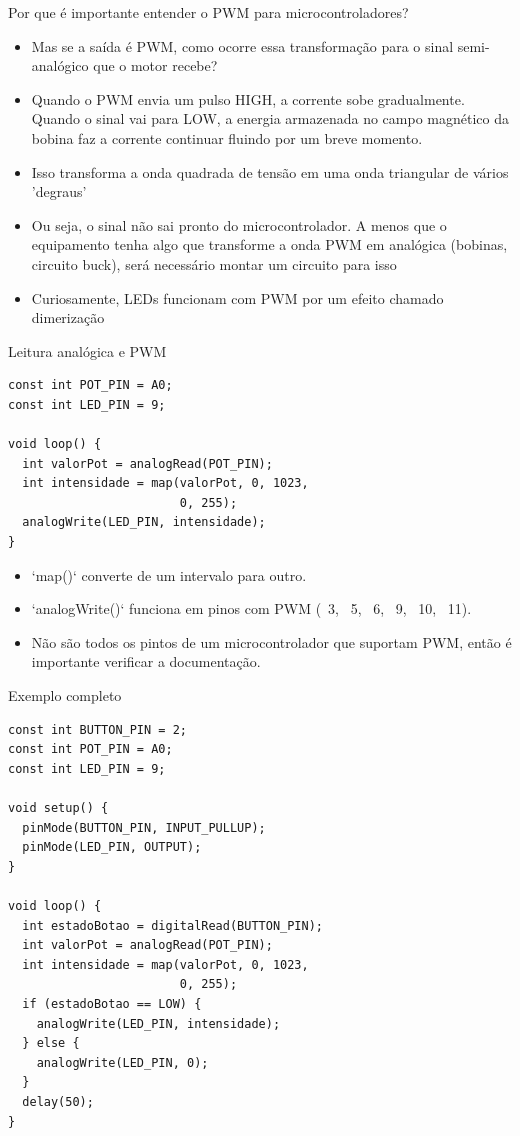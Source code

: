 \documentclass[10pt]{beamer}
\begin{document}
\begin{frame}{Por que é importante entender o PWM para microcontroladores?}
  \begin{itemize}
    \item Mas se a saída é PWM, como ocorre essa transformação para o sinal semi-analógico que o motor recebe? 
    \item Quando o PWM envia um pulso HIGH, a corrente sobe gradualmente. Quando o sinal vai para LOW, a energia armazenada no campo magnético da bobina faz a corrente continuar fluindo por um breve momento.
    \item Isso transforma a onda quadrada de tensão em uma onda triangular de vários 'degraus'
    \item Ou seja, o sinal não sai pronto do microcontrolador. A menos que o equipamento tenha algo que transforme a onda PWM em analógica (bobinas, circuito buck), será necessário montar um circuito para isso
    \item Curiosamente, LEDs funcionam com PWM por um efeito chamado dimerização
    
  \end{itemize}
\end{frame}

\begin{frame}[fragile]{Leitura analógica e PWM}
\begin{lstlisting}
const int POT_PIN = A0;
const int LED_PIN = 9;

void loop() {
  int valorPot = analogRead(POT_PIN);
  int intensidade = map(valorPot, 0, 1023,
                        0, 255);
  analogWrite(LED_PIN, intensidade);
}
\end{lstlisting}

  \begin{itemize}
    \item `map()` converte de um intervalo para outro.
    \item `analogWrite()` funciona em pinos com PWM (~3, ~5, ~6, ~9, ~10, ~11).
    \item Não são todos os pintos de um microcontrolador que suportam PWM, então é importante verificar a documentação.
  \end{itemize}
\end{frame}

\begin{frame}[fragile]{Exemplo completo}
\begin{lstlisting}
const int BUTTON_PIN = 2;
const int POT_PIN = A0;
const int LED_PIN = 9;

void setup() {
  pinMode(BUTTON_PIN, INPUT_PULLUP);
  pinMode(LED_PIN, OUTPUT);
}

void loop() {
  int estadoBotao = digitalRead(BUTTON_PIN);
  int valorPot = analogRead(POT_PIN);
  int intensidade = map(valorPot, 0, 1023,
                        0, 255);
  if (estadoBotao == LOW) {
    analogWrite(LED_PIN, intensidade);
  } else {
    analogWrite(LED_PIN, 0);
  }
  delay(50);
}
\end{lstlisting}
\end{frame}
\end{document}
